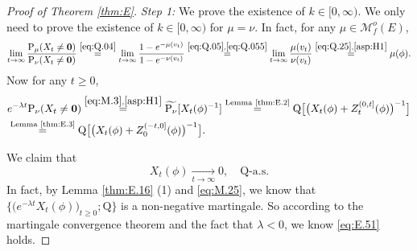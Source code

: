 \documentclass[12pt,a4paper]{amsart}
\numberwithin{equation}{section}
\theoremstyle{plain}
\theoremstyle{definition}
\theoremstyle{remark}
\begin{document}
\begin{proof}[Proof of Theorem \ref{thm:E}]
\emph{Step 1:} We prove the  existence of $k\in [0,\infty)$.
	We only need to prove the existence of $k\in [0,\infty)$ 
	for $\mu=\nu$.
	In fact, for any $\mu\in \mathcal M_f^o(E)$,
\begin{align}
	\lim_{t\to \infty}\frac{\mathrm P_\mu(X_t \neq \mathbf 0)}{\mathrm P_\nu(X_t \neq \mathbf 0)}
	\overset{\eqref{eq:Q.04}} = \lim_{t\to \infty}\frac{1- e^{-\mu(v_t)}}{1- e^{-\nu(v_t)}}
	\overset{\eqref{eq:Q.05}, \eqref{eq:Q.055}} = \lim_{t\to \infty}\frac{\mu(v_t)}{\nu(v_t)}
	\overset{\eqref{eq:Q.25}, \eqref{asp:H1}} = \mu(\phi).
\end{align}
Now for any $t\geq 0$,
	\begin{align}\label{eq:E.5}
	&e^{-\lambda t}\mathrm P_\nu(X_t\neq \mathbf 0)
	\overset{\eqref{eq:M.3}, \eqref{asp:H1}}= \widetilde{\mathrm P_\nu}[X_t(\phi)^{-1}]
	\overset{\text{Lemma \ref{thm:E.2}}}=\mathrm Q\big[ \big(X_t(\phi) +Z^{(0,t]}_t(\phi)\big)^{-1}\big]
	\\&\overset{\text{Lemma \ref{thm:E.3}}}=\mathrm Q\big[ \big(X_t(\phi) +Z^{(-t,0]}_0(\phi)\big)^{-1}\big].
	\end{align}
	
We claim that
\begin{equation}\label{eq:E.51}
	X_t(\phi) \xrightarrow[t\to \infty]{} 0, \quad \mathrm Q\text{-a.s.}
\end{equation}
	In fact, by Lemma \ref{thm:E.16} (1) and \eqref{eq:M.25}, we know that $\big\{\big(e^{-\lambda t} X_t(\phi)\big)_{t\geq 0}; \mathrm Q\big\}$ is a non-negative martingale.
	So according to the martingale convergence theorem and the fact that $\lambda < 0$, we know \eqref{eq:E.51} holds.


\end{proof}
\end{document}
